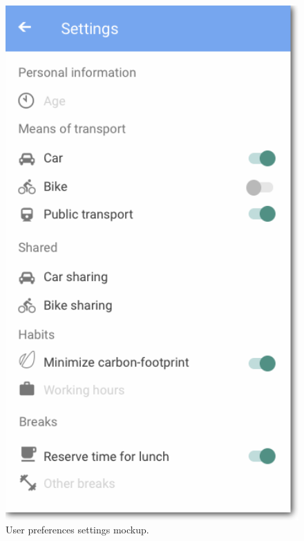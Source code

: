 \begin{figure}
	\centering
	\includegraphics[width=4.5in]{./images/settings.png}
	\caption{User preferences settings mockup.}
	\label{fig:MockupSettings}
\end{figure}


